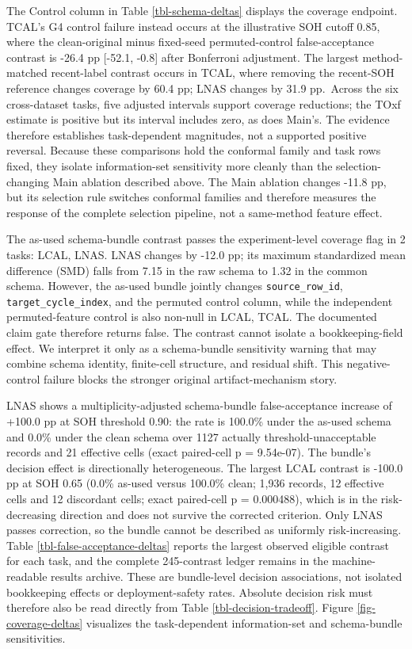 \documentclass[
  number,
  preprint]{elsarticle}
\begin{document}
The Control column in Table \ref{tbl-schema-deltas} displays the
coverage endpoint. TCAL's G4 control failure instead occurs at the
illustrative SOH cutoff 0.85, where the clean-original minus fixed-seed
permuted-control false-acceptance contrast is -26.4 pp {[}-52.1, -0.8{]}
after Bonferroni adjustment. The largest method-matched recent-label
contrast occurs in TCAL, where removing the recent-SOH reference changes
coverage by 60.4 pp; LNAS changes by 31.9 pp.~Across the six
cross-dataset tasks, five adjusted intervals support coverage
reductions; the TOxf estimate is positive but its interval includes
zero, as does Main's. The evidence therefore establishes task-dependent
magnitudes, not a supported positive reversal. Because these comparisons
hold the conformal family and task rows fixed, they isolate
information-set sensitivity more cleanly than the selection-changing
Main ablation described above. The Main ablation changes -11.8 pp, but
its selection rule switches conformal families and therefore measures
the response of the complete selection pipeline, not a same-method
feature effect.

The as-used schema-bundle contrast passes the experiment-level coverage
flag in 2 tasks: LCAL, LNAS. LNAS changes by -12.0 pp; its maximum
standardized mean difference (SMD) falls from 7.15 in the raw schema to
1.32 in the common schema. However, the as-used bundle jointly changes
\texttt{source\_row\_id}, \texttt{target\_cycle\_index}, and the
permuted control column, while the independent permuted-feature control
is also non-null in LCAL, TCAL. The documented claim gate therefore
returns false. The contrast cannot isolate a bookkeeping-field effect.
We interpret it only as a schema-bundle sensitivity warning that may
combine schema identity, finite-cell structure, and residual shift. This
negative-control failure blocks the stronger original artifact-mechanism
story.

LNAS shows a multiplicity-adjusted schema-bundle false-acceptance
increase of +100.0 pp at SOH threshold 0.90: the rate is 100.0\% under
the as-used schema and 0.0\% under the clean schema over 1127 actually
threshold-unacceptable records and 21 effective cells (exact paired-cell
p = 9.54e-07). The bundle's decision effect is directionally
heterogeneous. The largest LCAL contrast is -100.0 pp at SOH 0.65 (0.0\%
as-used versus 100.0\% clean; 1,936 records, 12 effective cells and 12
discordant cells; exact paired-cell p = 0.000488), which is in the
risk-decreasing direction and does not survive the corrected criterion.
Only LNAS passes correction, so the bundle cannot be described as
uniformly risk-increasing. Table \ref{tbl-false-acceptance-deltas}
reports the largest observed eligible contrast for each task, and the
complete 245-contrast ledger remains in the machine-readable results
archive. These are bundle-level decision associations, not isolated
bookkeeping effects or deployment-safety rates. Absolute decision risk
must therefore also be read directly from Table
\ref{tbl-decision-tradeoff}. Figure \ref{fig-coverage-deltas} visualizes
the task-dependent information-set and schema-bundle sensitivities.
\end{document}
